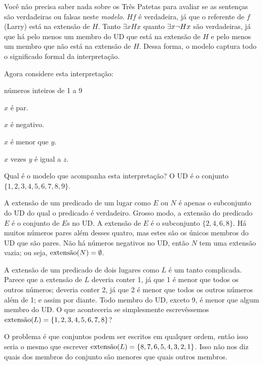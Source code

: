 Você não precisa saber nada sobre os Três Patetas para avaliar se as sentenças são verdadeiras ou falsas neste \emph{modelo}. $Hf$ é verdadeira, já que o referente de $f$ (Larry) está na extensão de $H$. Tanto $\exists x Hx$ quanto $\exists x \enot Hx$ são verdadeiras, já que há pelo menos um membro do UD que está na extensão de $H$ e pelo menos um membro que não está na extensão de $H$. Dessa forma, o modelo captura todo o significado formal da interpretação.

Agora considere esta interpretação:
\begin{ekey}
\item[UD:] números inteiros de 1 a 9
\item[Ex:] $x$ é par.
\item[Nx:] $x$ é negativo.
\item[Lxy:] $x$ é menor que $y$.
\item[Txyz:] $x$ vezes $y$ é igual a $z$.
\end{ekey}
Qual é o modelo que acompanha esta interpretação?
O UD é o conjunto $\{1,2,3,4,5,6,7,8,9\}$.

A extensão de um predicado de um lugar como $E$ ou $N$ é apenas o subconjunto do UD do qual o predicado é verdadeiro. Grosso modo, a extensão do predicado $E$ é o conjunto de $E$s no UD.
A extensão de $E$ é o subconjunto $\{2,4,6,8\}$. Há muitos números pares além desses quatro, mas estes são os únicos membros do UD que são pares. Não há números negativos no UD, então $N$ tem uma extensão vazia; ou seja, $\extension{N}=\emptyset$.

A extensão de um predicado de dois lugares como $L$ é um tanto complicada. Parece que a extensão de $L$ deveria conter 1, já que 1 é menor que todos os outros números; deveria conter 2, já que 2 é menor que todos os outros números além de 1; e assim por diante. Todo membro do UD, exceto 9, é menor que algum membro do UD. O que aconteceria se simplesmente escrevêssemos $\extension{L}=\{1,2,3,4,5,6,7,8\}$?

O problema é que conjuntos podem ser escritos em qualquer ordem, então isso seria o mesmo que escrever $\extension{L}=\{8,7,6,5,4,3,2,1\}$. Isso não nos diz quais dos membros do conjunto são menores que quais outros membros.

